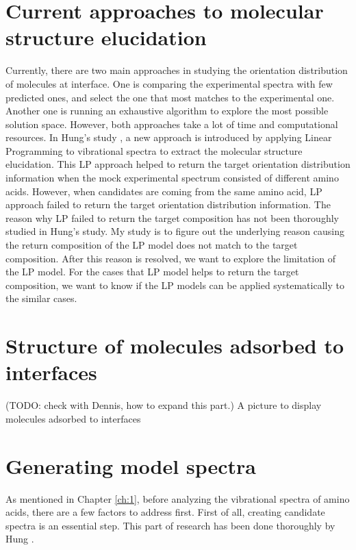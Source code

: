  \label{ch:2}
\section{Current approaches to molecular structure elucidation}
Currently, there are two main approaches in studying the orientation distribution of molecules at interface. One is comparing the experimental spectra with few predicted ones, and select the one that most matches to the experimental one. Another one is running an exhaustive algorithm to explore the most possible solution space. \cite{hore0033-rotations}  However, both approaches take a lot of time and computational resources. In Hung's study \cite{KuoKaiHung:Thesis:2015}, a new approach is introduced by applying Linear Programming to vibrational spectra to extract the molecular structure elucidation. This LP approach helped to return the target orientation distribution information when the mock experimental spectrum consisted of different amino acids. However, when candidates are coming from the same amino acid, LP approach failed to return the target orientation distribution information. The reason why LP failed to return the target composition has not been thoroughly studied in Hung's study. My study is to figure out the underlying reason causing the return composition of the LP model does not match to the target composition. After this reason is resolved, we want to explore the limitation of the LP model. For the cases that LP model helps to return the target composition, we want to know if the LP models can be applied systematically to the similar cases. \\
	
\section{Structure of molecules adsorbed to interfaces}
(TODO: check with Dennis, how to expand this part.) A picture to display molecules adsorbed to interfaces


\section{Generating model spectra}
As mentioned in Chapter \ref{ch:1}, before analyzing the vibrational spectra of amino acids, there are a few factors to address first. First of all, creating candidate spectra is an essential step. This part of research has been done thoroughly by Hung \cite{KuoKaiHung:Thesis:2015}. \\

